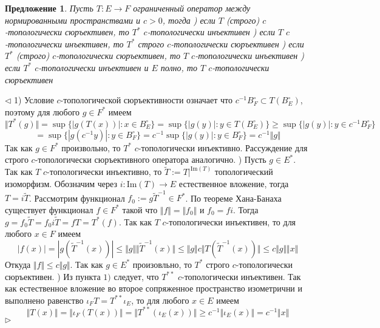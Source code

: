 \documentclass[12pt]{article}
\newtheorem{proposition}[theorem]{Предложение}
\newenvironment{proof}{\par $\triangleleft$}{$\triangleright$}
\begin{document}
\begin{proposition}\label{PrDualOps} Пусть $ T:E\to F$ ограниченный оператор между нормированными пространствами и $c>0$, тогда
) если $ T$ (строго) $c$-топологически сюръективен, то $ T^*$ $c$-топологически инъективен
) если $ T$ $c$-топологически инъективен, то $ T^*$ строго $c$-топологически сюръективен
) если $ T^*$ (строго) $c$-топологически сюръективен, то $ T$ $c$-топологически инъективен
) если $ T^*$ $c$-топологически инъективен и $E$ полно, то $ T$ $c$-топологически сюръективен
\end{proposition}
\begin{proof}
1) Условие $c$-топологической сюръективности означает что $c^{-1}B_F^\circ\subset T(B_E^\circ)$, поэтому для любого $g\in F^*$ имеем
$$
\Vert  T^*(g)\Vert
=\sup\{|g( T(x))|:x\in B_E^\circ\}
=\sup\{|g(y)|: y\in T(B_E^\circ)\}
\geq\sup\{|g(y)|: y\in c^{-1}B_F^\circ\}
$$
$$
=\sup\{|g(c^{-1}y)|: y\in B_F^\circ\}
=c^{-1}\sup\{|g(y)|: y\in B_F^\circ\}
=c^{-1}\Vert g\Vert
$$
Так как $g\in F^*$ произвольно, то $ T^*$ $c$-топологически инъективно. Рассуждение для строго $c$-топологически сюръективного оператора аналогично.
) Пусть $g\in E^*$. Так как $ T$ $c$-топологически инъективно, то $\tilde{ T}:= T|^{\mathrm{Im}( T)}$ топологический изоморфизм. Обозначим через $i:\mathrm{Im}( T)\to E$ естественное вложение, тогда 
$ T=i\tilde{ T}$. Рассмотрим функционал $f_0:=g\tilde{ T}^{-1}\in F^*$. По теореме Хана-Банаха существует функционал $f\in F^*$ такой что $\Vert f\Vert=\Vert f_0\Vert$ и $f_0=fi$. Тогда
$g=f_0\tilde{ T}=f_0 i\tilde{ T}=f T= T^*(f)$. Так как $ T$ $c$-топологически инъективен, то для любого $x\in F$ имеем
$$
|f(x)|=|g(\tilde{ T}^{-1}(x))|
\leq\Vert g\Vert\Vert \tilde{ T}^{-1}(x)\Vert
\leq\Vert g\Vert c\Vert  T(\tilde{ T}^{-1}(x))\Vert
\leq c\Vert g\Vert\Vert x\Vert
$$
Откуда $\Vert f\Vert\leq c\Vert g\Vert$. Так как $g\in E^*$ произовльно, то $ T^*$ строго $c$-топологически сюръективен.
) Из пункта $1)$ следует, что $ T^{**}$ $c$-топологически инъективен. Так как естественное вложение во второе сопряженное пространство изометрични и выполнено равенство $\iota_F  T = T^{**}\iota_E$, 
то для любого $x\in E$ имеем
$$
\Vert T(x)\Vert
=\Vert \iota_F( T(x))\Vert
=\Vert T^{**}(\iota_E(x))\Vert
\geq c^{-1}\Vert \iota_E(x)\Vert
=c^{-1}\Vert x\Vert
$$
\end{proof}
\end{document}
